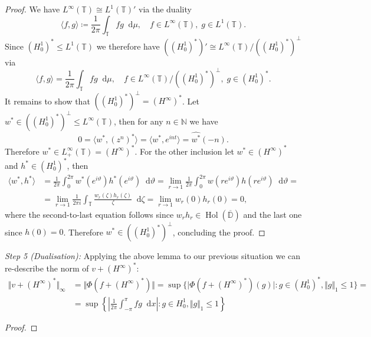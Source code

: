 \documentclass[letterpaper, 11pt]{article}
\newcommand{\D}{\mathbb{D}}
\newcommand{\T}{\mathbb{T}}
\newcommand{\N}{\mathbb{N}}
\newcommand{\1}{\mathds{1}}
\newcommand{\diff}{\mathop{}\!\mathrm{d}}
\newcommand{\cl}[1]{\overline{#1}}
\DeclareMathOperator*{\Hol}{Hol}
\theoremstyle{definition}
\newenvironment{innerproof}
 {\renewcommand{\qedsymbol}{}\proof}
 {\endproof}
\begin{document}
\begin{proof}
  We have $L^\infty(\T) \cong L^1(\T)'$ via the duality
  $$ \langle f, g \rangle \coloneqq \frac{1}{2\pi} \int_\T f g \diff \mu, \quad f \in L^\infty(\T),\; g \in L^1(\T). $$
  Since $(H_0^1)^* \leq L^1(\T)$ we therefore have $((H_0^1)^*)' \cong L^\infty(\T) / ((H_0^1)^*)^\perp$ via
  $$ \langle f, g \rangle = \frac{1}{2\pi} \int_\T f g \diff \mu, \quad f \in L^\infty(\T) / ((H_0^1)^*)^\perp,\; g \in (H_0^1)^*. $$
  It remains to show that $((H_0^1)^*)^\perp = (H^\infty)^*$. Let $w^* \in ((H_0^1)^*)^\perp \leq L^\infty(\T)$, then for any $n \in \N$ we have
  $$ 0 = \langle w^*, (z^n)^* \rangle = \langle w^*, e^{i n t} \rangle = \widehat{w^*}(-n). $$
  Therefore $w^* \in L_+^\infty(\T) = (H^\infty)^*$. For the other inclusion let $w^* \in (H^\infty)^*$ and $h^* \in (H_0^1)^*$, then
  \begin{align*}
    \langle w^*, h^* \rangle &= \frac{1}{2\pi} \int_0^{2 \pi} w^*(e^{i \vartheta}) h^*(e^{i \vartheta}) \diff \vartheta = \lim_{r \to 1} \frac{1}{2\pi} \int_0^{2 \pi} w(r e^{i \vartheta}) h(r e^{i \vartheta}) \diff \vartheta = \\
    &= \lim_{r \to 1} \frac{1}{2\pi i} \int_\T \frac{w_r(\zeta) h_r(\zeta)}{\zeta} \diff \zeta = \lim_{r \to 1} w_r(0) h_r(0) = 0,
  \end{align*}
  where the second-to-last equation follows since $w_r h_r \in \Hol(\cl{\D})$ and the last one since $h(0) = 0$. Therefore $w^* \in ((H_0^1)^*)^\perp$, concluding the proof.
\end{proof}

\begin{innerproof}[Proof (continued)]
    \textit{Step 5 (Dualisation):} Applying the above lemma to our previous situation we can re-describe the norm of $v + (H^\infty)^*$:
    \begin{align*}
      \Vert v + (H^\infty)^* \Vert_\infty &= \Vert \Phi(f + (H^\infty)^*) \Vert = \sup \{ \vert \Phi(f + (H^\infty)^*)(g) \vert : g \in (H_0^1)^*, \Vert g \Vert_1 \leq 1 \} = \\
      &= \sup \left\{ \left\vert \frac{1}{2 \pi} \int_{-\pi}^\pi f g \diff x \right\vert : g \in H_0^1, \Vert g \Vert_1 \leq 1 \right\}
    \end{align*}
\end{innerproof}

\begin{proof}
\end{proof}
\end{document}
